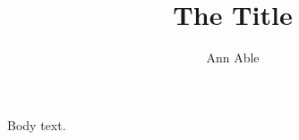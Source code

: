 \documentclass{tlp}
\title{The Title}
\author{Ann Able}
\begin{document}
\maketitle
Body text.
\end{document}
